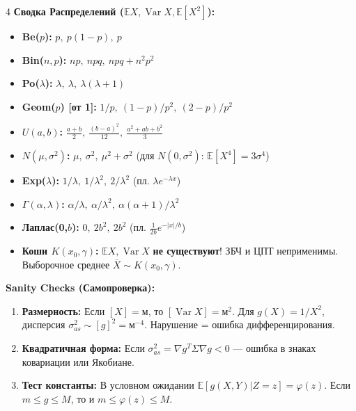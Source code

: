 \documentclass[8pt, a4paper, landscape]{extarticle}
\newcommand{\E}{\mathbb{E}}
\DeclareMathOperator{\Var}{Var}
\begin{document}
\begin{multicols*}{4}
\textbf{Сводка Распределений ($\E X, \Var X, \E[X^2]$):}
\begin{itemize}
    \item \textbf{Be($p$):} $p, \ p(1-p), \ p$
    \item \textbf{Bin($n,p$):} $np, \ npq, \ npq+n^2p^2$
    \item \textbf{Po($\lambda$):} $\lambda, \ \lambda, \ \lambda(\lambda+1)$
    \item \textbf{Geom($p$) [от 1]:} $1/p, \ (1-p)/p^2, \ (2-p)/p^2$
    \item \textbf{$U(a,b)$:} $\frac{a+b}{2}, \ \frac{(b-a)^2}{12}, \ \frac{a^2+ab+b^2}{3}$
    \item \textbf{$N(\mu,\sigma^2)$:} $\mu, \ \sigma^2, \ \mu^2+\sigma^2$ (для $N(0,\sigma^2)$: $\E[X^4]=3\sigma^4$)
    \item \textbf{Exp($\lambda$):} $1/\lambda, \ 1/\lambda^2, \ 2/\lambda^2$ (пл. $\lambda e^{-\lambda x}$)
    \item \textbf{$\Gamma(\alpha,\lambda)$:} $\alpha/\lambda, \ \alpha/\lambda^2, \ \alpha(\alpha+1)/\lambda^2$
    \item \textbf{Лаплас(0,$b$):} $0, \ 2b^2, \ 2b^2$ \quad (пл. $\frac{1}{2b}e^{-|x|/b}$)
    \item \textbf{Коши $K(x_0, \gamma)$:} $\E X, \Var X$ \textbf{не существуют}! ЗБЧ и ЦПТ неприменимы. Выборочное среднее $\overline{X} \sim K(x_0, \gamma)$.
\end{itemize}

\textbf{Sanity Checks (Самопроверка):}
\begin{enumerate}
    \item \textbf{Размерность:} Если $[X]\!=\!\text{м}$, то $[\Var X]\!=\!\text{м}^2$. Для $g(X)\!=\!1/X^2$, дисперсия $\sigma_{as}^2 \sim [g]^2 \!=\! \text{м}^{-4}$. Нарушение = ошибка дифференцирования.
    \item \textbf{Квадратичная форма:} Если $\sigma_{as}^2 = \nabla g^T \Sigma \nabla g < 0$ --- ошибка в знаках ковариации или Якобиане.
    \item \textbf{Тест константы:} В условном ожидании $\E[g(X,Y)|Z=z] = \varphi(z)$. Если $m \le g \le M$, то и $m \le \varphi(z) \le M$.
\end{enumerate}

\end{multicols*}
\end{document}
